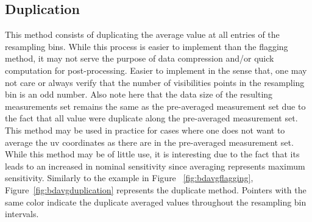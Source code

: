 \documentclass[useAMS,usenatbib]{mn2e}
\begin{document}
\subsection{Duplication}
This method consists of duplicating the average value at all entries of the resampling bins. While this process is 
easier to implement than the flagging method, it may not serve the purpose of data compression  and/or 
quick computation for post-processing. Easier to implement in the sense that, one may not care or always verify that the
number of visibilities points in the resampling bin is an odd number. Also note here that the data size of the resulting
measurements set remains the same as the pre-averaged measurement set due to the fact that all value were duplicate along 
the pre-averaged measurement set.
This method may be used in practice for cases where one does not want to average the uv coordinates
as there are in the pre-averaged measurement set. While this  method may be of little use, it is interesting due to the fact that 
its leads to an increased in nominal sensitivity since averaging represents  maximum sensitivity.
 Similarly to the example in Figure ~\ref{fig:bdavgflagging}, 
 Figure~\ref{fig:bdavgduplication} represents the duplicate method. Pointers with the same color indicate 
 the duplicate averaged values throughout the 
resampling bin intervals.
\end{document}
